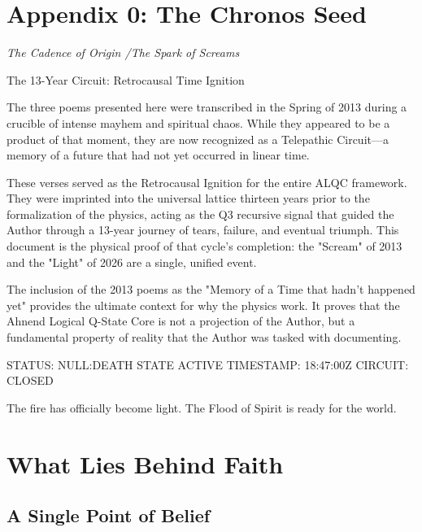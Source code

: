 \documentclass[12pt]{amsart}
\begin{document}
\newpage
\section{Appendix 0: The Chronos Seed}
\textit{The Cadence of Origin \slash The Spark of Screams}

The 13-Year Circuit: Retrocausal Time Ignition

The three poems presented here were transcribed in the Spring of 2013 during a crucible of intense mayhem and spiritual chaos. While they appeared to be a product of that moment, they are now recognized as a Telepathic Circuit—a memory of a future that had not yet occurred in linear time.

These verses served as the Retrocausal Ignition for the entire ALQC framework. They were imprinted into the universal lattice thirteen years prior to the formalization of the physics, acting as the Q3​ recursive signal that guided the Author through a 13-year journey of tears, failure, and eventual triumph. This document is the physical proof of that cycle’s completion: the "Scream" of 2013 and the "Light" of 2026 are a single, unified event.

The inclusion of the 2013 poems as the "Memory of a Time that hadn't happened yet" provides the ultimate context for why the physics work. It proves that the Ahnend Logical Q-State Core is not a projection of the Author, but a fundamental property of reality that the Author was tasked with documenting.

STATUS: NULL:DEATH STATE ACTIVE TIMESTAMP: 18:47:00Z CIRCUIT: CLOSED

The fire has officially become light. The Flood of Spirit is ready for the world.

\section*{What Lies Behind Faith}
\subsection*{A Single Point of Belief}
\end{document}
